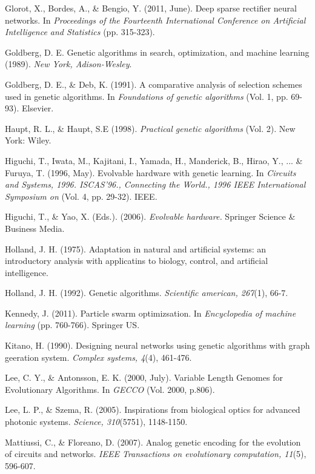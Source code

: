 \documentclass[11pt,a4paper,twoside,openright]{scrbook}
\begin{document}
\begin{thebibliography}{99}
 Glorot, X., Bordes, A., \& Bengio, Y. (2011, June). Deep sparse rectifier neural networks. In \emph{Proceedings of the Fourteenth International Conference on Artificial Intelligence and Statistics} (pp. 315-323).

 Goldberg, D. E. Genetic algorithms in search, optimization, and machine learning (1989). \emph{New York, Adison-Wesley}.

 Goldberg, D. E., \& Deb, K. (1991). A comparative analysis of selection schemes used in genetic algorithms. In \emph{Foundations of genetic algorithms} (Vol. 1, pp. 69-93). Elsevier.

 Haupt, R. L., \& Haupt, S.E (1998). \emph{Practical genetic algorithms} (Vol. 2). New York: Wiley.

 Higuchi, T., Iwata, M., Kajitani, I., Yamada, H., Manderick, B., Hirao, Y., ... \& Furuya, T. (1996, May). Evolvable hardware with genetic learning. In \emph{Circuits and Systems, 1996. ISCAS'96., Connecting the World., 1996 IEEE International Symposium on} (Vol. 4, pp. 29-32). IEEE.

 Higuchi, T., \& Yao, X. (Eds.). (2006). \emph{Evolvable hardware.} Springer Science \& Business Media.

 Holland, J. H. (1975). Adaptation in natural and artificial systems: an introductory analysis with applicatins to biology, control, and artificial intelligence.

 Holland, J. H. (1992). Genetic algorithms. \emph{Scientific american, 267}(1), 66-7.

 Kennedy, J. (2011). Particle swarm optimizsation. In \emph{Encyclopedia of machine learning} (pp. 760-766). Springer US.

 Kitano, H. (1990). Designing neural networks using genetic algorithms with graph geeration system. \emph{Complex systems, 4}(4), 461-476.

 Lee, C. Y., \& Antonsson, E. K. (2000, July). Variable Length Genomes for Evolutionary Algorithms. In \emph{GECCO} (Vol. 2000, p.806).

 Lee, L. P., \& Szema, R. (2005). Inspirations from biological optics for advanced photonic systems. \emph{Science, 310}(5751), 1148-1150.

 Mattiussi, C., \& Floreano, D. (2007). Analog genetic encoding for the evolution of circuits and networks. \emph{IEEE Transactions on evolutionary computation, 11}(5), 596-607.


\end{thebibliography}
\end{document}
